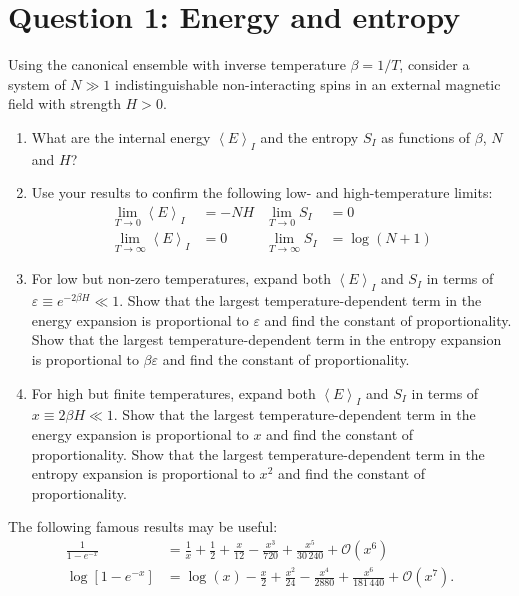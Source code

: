 \documentclass[12 pt]{article} %
\newcommand{\cO}{\ensuremath{\mathcal O} }
\newcommand{\be}{\ensuremath{\beta} }
\newcommand{\eps}{\ensuremath{\varepsilon} }
\newcommand{\vev}[1]{\ensuremath{\left\langle #1 \right\rangle} }
\newcommand{\showmarks}[1]{\rightline{\texttt{[#1 marks]}}} %
\begin{document}
\newpage
\section*{Question 1: Energy and entropy} %
Using the canonical ensemble with inverse temperature $\be = 1 / T$, consider a system of $N \gg 1$ indistinguishable non-interacting spins in an external magnetic field with strength $H > 0$.

\begin{enumerate}[label={(\alph*)}]
  \item What are the internal energy $\vev{E}_I$ and the entropy $S_I$ as functions of $\be$, $N$ and $H$?

  \showmarks{4}

  \item Use your results to confirm the following low- and high-temperature limits:
        \begin{align*}
               \lim_{T \to 0} \vev{E}_I & = -NH &      \lim_{T \to 0} S_I & = 0           \\
          \lim_{T \to \infty} \vev{E}_I & = 0   & \lim_{T \to \infty} S_I & = \log(N + 1)
        \end{align*}

  \showmarks{6}

  \item For low but non-zero temperatures, expand both $\vev{E}_I$ and $S_I$ in terms of $\eps \equiv e^{-2\be H} \ll 1$.
        Show that the largest temperature-dependent term in the energy expansion is proportional to $\eps$ and find the constant of proportionality.
        Show that the largest temperature-dependent term in the entropy expansion is proportional to $\be\eps$ and find the constant of proportionality.

  \showmarks{8}

  \item For high but finite temperatures, expand both $\vev{E}_I$ and $S_I$ in terms of $x \equiv 2\be H \ll 1$.
        Show that the largest temperature-dependent term in the energy expansion is proportional to $x$ and find the constant of proportionality.
        Show that the largest temperature-dependent term in the entropy expansion is proportional to $x^2$ and find the constant of proportionality.

  \showmarks{8}
\end{enumerate}

\noindent The following famous results may be useful:
\begin{align*}
  \frac{1}{1 - e^{-x}} & = \frac{1}{x} + \frac{1}{2} + \frac{x}{12} - \frac{x^3}{720} + \frac{x^5}{30\,240} + \cO\!\left(x^6\right) \\
  \log\left[1 - e^{-x}\right] & = \log(x) - \frac{x}{2} + \frac{x^2}{24} - \frac{x^4}{2880} + \frac{x^6}{181\,440} + \cO\!\left(x^7\right).
\end{align*}
\end{document}
